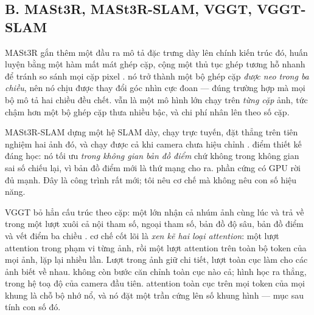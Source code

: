 \documentclass[../../deep_learning.tex]{subfiles}
\begin{document}
\subsection{B. MASt3R, MASt3R-SLAM, VGGT, VGGT-SLAM}
\begin{mach}
\item {}
\gp MASt3R gắn thêm một đầu ra mô tả đặc trưng dày lên chính kiến trúc đó, huấn luyện bằng một hàm mất mát ghép cặp, cộng một thủ tục ghép tương hỗ nhanh để tránh so sánh mọi cặp pixel \cite{leroy2024mast3r}.
\hq nó trở thành một bộ ghép cặp \emph{được neo trong ba chiều}, nên nó chịu được thay đổi góc nhìn cực đoan --- đúng trường hợp mà mọi bộ mô tả hai chiều đều chết.
\gia vẫn là một mô hình lớn chạy trên \emph{từng cặp} ảnh, tức chậm hơn một bộ ghép cặp thưa nhiều bậc, và chi phí nhân lên theo số cặp.

\item {}
\gp MASt3R-SLAM dựng một hệ SLAM dày, chạy trực tuyến, đặt thẳng trên tiên nghiệm hai ảnh đó, và chạy được cả khi camera chưa hiệu chỉnh \cite{murai2025mast3rslam}.
\hq điểm thiết kế đáng học: nó tối ưu \emph{trong không gian bản đồ điểm} chứ không trong không gian sai số chiếu lại, vì bản đồ điểm mới là thứ mạng cho ra.
\gd phần cứng có GPU rời đủ mạnh. Đây là công trình rất mới; tôi nêu cơ chế mà không nêu con số hiệu năng.

\item {}
\gp VGGT bỏ hẳn cấu trúc theo cặp: một  lớn nhận cả nhúm ảnh cùng lúc và trả về trong một lượt xuôi cả nội tham số, ngoại tham số, bản đồ độ sâu, bản đồ điểm và vết điểm ba chiều \cite{wang2025vggt}.
\gp cơ chế cốt lõi là \emph{xen kẽ hai loại attention}: một lượt attention trong phạm vi từng ảnh, rồi một lượt attention trên toàn bộ token của mọi ảnh, lặp lại nhiều lần. Lượt trong ảnh giữ chi tiết, lượt toàn cục làm cho các ảnh biết về nhau.
\hq không còn bước căn chỉnh toàn cục nào cả; hình học ra thẳng, trong hệ toạ độ của camera đầu tiên.
\gia attention toàn cục trên mọi token của mọi khung là chỗ bộ nhớ nổ, và nó đặt một trần cứng lên số khung hình --- mục sau tính con số đó.


\end{mach}
\end{document}
